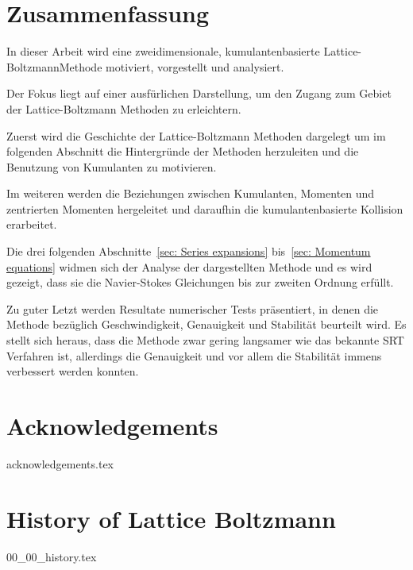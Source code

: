 \documentclass[12pt,a4paper,twoside]{article}
\begin{document}
\section*{Zusammenfassung}
In dieser Arbeit wird eine zweidimensionale, kumulantenbasierte Lattice-Boltzmann\linebreak Methode motiviert, vorgestellt und analysiert.

Der Fokus liegt auf einer ausf\"urlichen Darstellung, um den Zugang zum Gebiet der Lattice-Boltzmann Methoden zu erleichtern.

Zuerst wird die Geschichte der Lattice-Boltzmann Methoden dargelegt um im folgenden Abschnitt die Hintergr\"unde der Methoden herzuleiten und die Benutzung von Kumulanten zu motivieren.

Im weiteren werden die Beziehungen zwischen Kumulanten, Momenten und zentrierten Momenten hergeleitet und daraufhin die kumulantenbasierte Kollision erarbeitet.

Die drei folgenden Abschnitte~\ref{sec: Series expansions} bis~\ref{sec: Momentum equations} widmen sich der Analyse der dargestellten Methode und es wird gezeigt, dass sie die Navier-Stokes Gleichungen bis zur zweiten Ordnung erf\"ullt.

Zu guter Letzt werden Resultate numerischer Tests pr\"asentiert, in denen die Methode bez\"uglich Geschwindigkeit, Genauigkeit und Stabilit\"at beurteilt wird.
Es stellt sich heraus, dass die Methode zwar gering langsamer wie das bekannte SRT Verfahren ist, allerdings die Genauigkeit und vor allem die Stabilit\"at immens verbessert werden konnten.

\newpage
\tableofcontents
\newpage

\section*{Acknowledgements}
{acknowledgements.tex}
\newpage

\printglossaries{}
\newpage

\pagestyle{headings}
\newpage
\section{History of Lattice Boltzmann}
\label{sec: History of Lattice Boltzmann}
{00_00_history.tex}

\newpage
\end{document}
